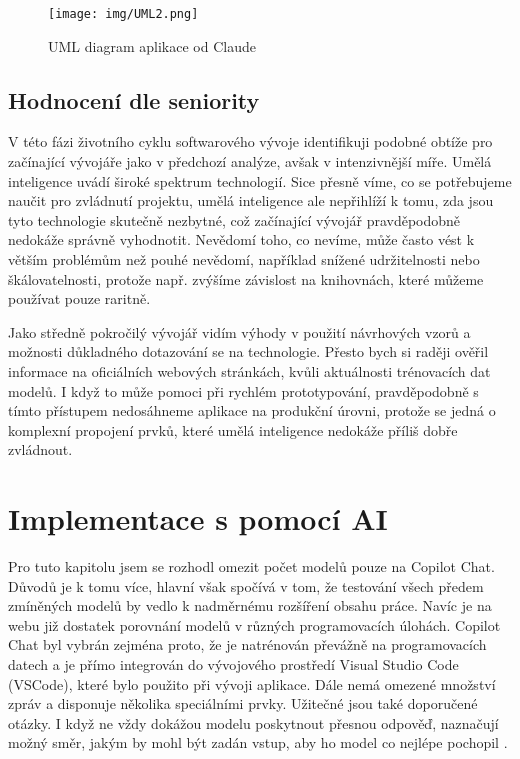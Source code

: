 \documentclass[FM,DP]{tulthesis}
\begin{document}
		\begin{figure}[H]
			\centering
			\texttt{[image: img/UML2.png]}
			\caption{UML diagram aplikace od Claude \cite{general}}
			\label{fig:claude_uml}
		\end{figure}
		
		\subsection{Hodnocení dle seniority}
		V této fázi životního cyklu softwarového vývoje identifikuji podobné obtíže pro začínající vývojáře jako v předchozí analýze, avšak v intenzivnější míře. Umělá inteligence uvádí široké spektrum technologií. Sice přesně víme, co se potřebujeme naučit pro zvládnutí projektu, umělá inteligence ale nepřihlíží k tomu, zda jsou tyto technologie skutečně nezbytné, což začínající vývojář pravděpodobně nedokáže správně vyhodnotit. Nevědomí toho, co nevíme, může často vést k větším problémům než pouhé nevědomí, například snížené udržitelnosti nebo škálovatelnosti, protože např. zvýšíme závislost na knihovnách, které můžeme používat pouze raritně.
		
		Jako středně pokročilý vývojář vidím výhody v použití návrhových vzorů a možnosti důkladného dotazování se na technologie. Přesto bych si raději ověřil informace na oficiálních webových stránkách, kvůli aktuálnosti trénovacích dat modelů. I když to může pomoci při rychlém prototypování, pravděpodobně s tímto přístupem nedosáhneme aplikace na produkční úrovni, protože se jedná o komplexní propojení prvků, které umělá inteligence nedokáže příliš dobře zvládnout.
		
		\section{Implementace s pomocí AI}
		Pro tuto kapitolu jsem se rozhodl omezit počet modelů pouze na Copilot Chat. Důvodů je k tomu více, hlavní však spočívá v tom, že testování všech předem zmíněných modelů by vedlo k nadměrnému rozšíření obsahu práce. Navíc je na webu již dostatek porovnání modelů v různých programovacích úlohách. Copilot Chat byl vybrán zejména proto, že je natrénován převážně na programovacích datech a je přímo integrován do vývojového prostředí Visual Studio Code (VSCode), které bylo použito při vývoji aplikace. Dále nemá omezené množství zpráv a disponuje několika speciálními prvky. Užitečné jsou také doporučené otázky. I když ne vždy dokážou modelu poskytnout přesnou odpověď, naznačují možný směr, jakým by mohl být zadán vstup, aby ho model co nejlépe pochopil \cite{gitCopilot}.
		
\end{document}
